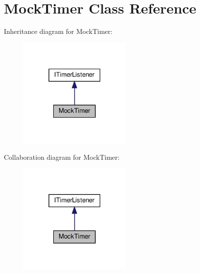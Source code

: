 \hypertarget{classMockTimer}{}\section{Mock\+Timer Class Reference}
\label{classMockTimer}


Inheritance diagram for Mock\+Timer\+:
\nopagebreak
\begin{figure}[H]
\begin{center}
\leavevmode
\includegraphics[width=159pt]{classMockTimer__inherit__graph}
\end{center}
\end{figure}


Collaboration diagram for Mock\+Timer\+:
\nopagebreak
\begin{figure}[H]
\begin{center}
\leavevmode
\includegraphics[width=159pt]{classMockTimer__coll__graph}
\end{center}
\end{figure}
